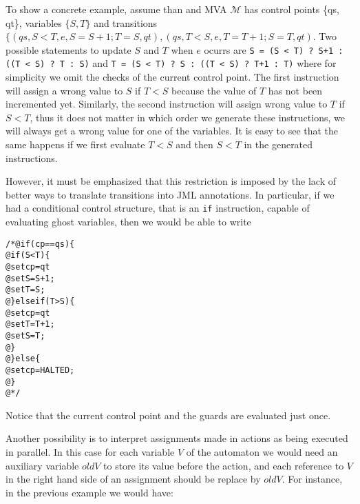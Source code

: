 \documentclass[a4paper,10pt]{article}
\theoremstyle{definition}
\begin{document}
To show a concrete example, assume than and MVA $\mathcal{M}$ has control points \{qs, qt\}, variables
$\{S, T\}$ and transitions $\{(qs, S < T, e, S=S+1;T=S , qt), (qs, T < S, e, T=T+1;S=T , qt)$. Two
possible statements to update $S$ and $T$ when $e$ ocurrs are \texttt{S = (S < T) ? S+1 : ((T < S) ? T : S)}
and \texttt{T = (S < T) ? S : ((T < S) ? T+1 : T)} where for simplicity we omit the checks of the current
control point.
The first instruction will assign a wrong value to $S$ if
$T < S$ because the value of $T$ has not been incremented yet. Similarly, the second instruction will assign
wrong value to $T$ if $S < T$, thus it does not matter in which order we generate these instructions, we
will always get a wrong value for one of the variables. It is easy to see that the same happens if we
first evaluate $T < S$ and then $S < T$ in the generated instructions.

However, it must be emphasized that this restriction is imposed by the lack of better ways to translate
transitions into JML annotations. In particular, if we had a conditional control structure, that is an
\texttt{if} instruction, capable of evaluating ghost variables, then we would be able to write 

\begin{alltt}
/*@ if (cp == qs) \{
  @   if (S < T) \{
  @     set cp = qt
  @     set S = S + 1;
  @     set T = S;
  @   \} else if (T > S) \{
  @     set cp = qt
  @     set T = T + 1;
  @     set S = T;
  @   \}
  @ \} else \{
  @   set cp = HALTED;
  @ \}
  @*/
\end{alltt}
Notice that the current control point and the guards are evaluated just once.

Another possibility is to interpret assignments made in actions as being executed in parallel. In this case
for each variable $V$ of the automaton we would need an auxiliary variable $oldV$ to store its value before
the action, and each reference to $V$ in the right hand side of an assignment should be replace by $oldV$.
For instance, in the previous example we would have:
\end{document}

